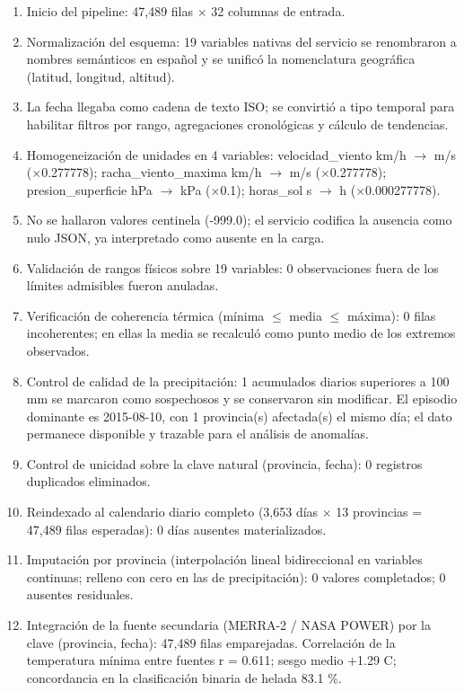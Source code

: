 \begin{enumerate}[leftmargin=*,itemsep=0.35em]
\item Inicio del pipeline: 47,489 filas \ensuremath{\times} 32 columnas de entrada.
\item Normalización del esquema: 19 variables nativas del servicio se renombraron a nombres semánticos en español y se unificó la nomenclatura geográfica (latitud, longitud, altitud).
\item La fecha llegaba como cadena de texto ISO; se convirtió a tipo temporal para habilitar filtros por rango, agregaciones cronológicas y cálculo de tendencias.
\item Homogeneización de unidades en 4 variables: velocidad\_\allowbreak{}viento km/h \ensuremath{\rightarrow} m/s (\ensuremath{\times}0.277778); racha\_\allowbreak{}viento\_\allowbreak{}maxima km/h \ensuremath{\rightarrow} m/s (\ensuremath{\times}0.277778); presion\_\allowbreak{}superficie hPa \ensuremath{\rightarrow} kPa (\ensuremath{\times}0.1); horas\_\allowbreak{}sol s \ensuremath{\rightarrow} h (\ensuremath{\times}0.000277778).
\item No se hallaron valores centinela (-999.0); el servicio codifica la ausencia como nulo JSON, ya interpretado como ausente en la carga.
\item Validación de rangos físicos sobre 19 variables: 0 observaciones fuera de los límites admisibles fueron anuladas.
\item Verificación de coherencia térmica (mínima \ensuremath{\leq} media \ensuremath{\leq} máxima): 0 filas incoherentes; en ellas la media se recalculó como punto medio de los extremos observados.
\item Control de calidad de la precipitación: 1 acumulados diarios superiores a 100 mm se marcaron como sospechosos y se conservaron sin modificar. El episodio dominante es 2015-08-10, con 1 provincia(s) afectada(s) el mismo día; el dato permanece disponible y trazable para el análisis de anomalías.
\item Control de unicidad sobre la clave natural (provincia, fecha): 0 registros duplicados eliminados.
\item Reindexado al calendario diario completo (3,653 días \ensuremath{\times} 13 provincias = 47,489 filas esperadas): 0 días ausentes materializados.
\item Imputación por provincia (interpolación lineal bidireccional en variables continuas; relleno con cero en las de precipitación): 0 valores completados; 0 ausentes residuales.
\item Integración de la fuente secundaria (MERRA-2 / NASA POWER) por la clave (provincia, fecha): 47,489 filas emparejadas. Correlación de la temperatura mínima entre fuentes r = 0.611; sesgo medio +1.29 \textdegree{}C; concordancia en la clasificación binaria de helada 83.1 \%.

\end{enumerate}
